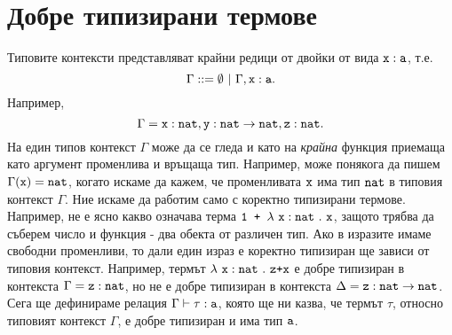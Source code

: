 \section{Добре типизирани термове}

Типовите контексти представляват крайни редици от двойки от вида $\texttt{x}:\texttt{a}$, т.е.
\[\Gamma ::= \emptyset\ |\ \Gamma,\type{x}{a}.\]
Например,
\[\Gamma = \texttt{x}:\texttt{nat}, \texttt{y}:\texttt{nat} \to \texttt{nat},\texttt{z}:\texttt{nat}.\]
На един типов контекст $\Gamma$ може да се гледа и като на \emph{крайна} функция приемаща като аргумент променлива и връщаща тип.
Например, може понякога да пишем $\Gamma(\texttt{x}) = \texttt{nat}$, когато искаме да кажем, че променливата $\texttt{x}$ има тип $\texttt{nat}$ в типовия контекст $\Gamma$.
Ние искаме да работим само с коректно типизирани термове.
Например, не е ясно какво означава терма $\texttt{1 + }\lambda~\texttt{x}:\texttt{nat}~.~{\texttt{x}}$,
защото трябва да съберем число и функция - два обекта от различен тип.
Ако в изразите имаме свободни променливи, то дали един израз е коректно типизиран ще зависи от типовия контекст.
Например, термът $\lambda~\texttt{x}:\texttt{nat}~.~{\texttt{z+x}}$ е добре типизиран в контекста $\Gamma = \texttt{z}:\texttt{nat}$, но не е добре типизиран в контекста
$\Delta = \texttt{z}:\texttt{nat}\to\texttt{nat}$.
Сега ще дефинираме релация $\Gamma \vdash \tau : \texttt{a}$, която ще ни казва, че термът $\tau$, относно типовият контекст $\Gamma$,
е добре типизиран и има тип $\texttt{a}$.

